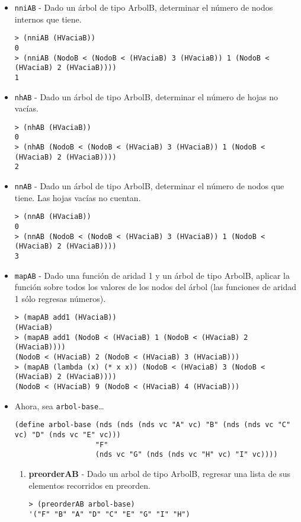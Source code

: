 \documentclass{article}
\begin{document}
\newpage
\begin{itemize}
\item \texttt{nniAB} - Dado un árbol de tipo ArbolB, determinar el número de nodos internos que tiene.
\begin{verbatim}
> (nniAB (HVaciaB))
0
> (nniAB (NodoB < (NodoB < (HVaciaB) 3 (HVaciaB)) 1 (NodoB < (HVaciaB) 2 (HVaciaB))))
1
\end{verbatim}

\item \texttt{nhAB} - Dado un árbol de tipo ArbolB, determinar el número de hojas no vacías.
\begin{verbatim}
> (nhAB (HVaciaB))
0
> (nhAB (NodoB < (NodoB < (HVaciaB) 3 (HVaciaB)) 1 (NodoB < (HVaciaB) 2 (HVaciaB))))
2
\end{verbatim}

\item \texttt{nnAB} - Dado un árbol de tipo ArbolB, determinar el número de nodos que tiene. Las hojas vacías no cuentan.
\begin{verbatim}
> (nnAB (HVaciaB))
0
> (nnAB (NodoB < (NodoB < (HVaciaB) 3 (HVaciaB)) 1 (NodoB < (HVaciaB) 2 (HVaciaB))))
3
\end{verbatim}

\item \texttt{mapAB} - Dado una función de aridad 1 y un árbol de tipo ArbolB, aplicar la función sobre todos los valores de los nodos del árbol (las funciones de aridad 1 sólo regresas números).
\begin{verbatim}
> (mapAB add1 (HVaciaB))
(HVaciaB)
> (mapAB add1 (NodoB < (HVaciaB) 1 (NodoB < (HVaciaB) 2 (HVaciaB))))
(NodoB < (HVaciaB) 2 (NodoB < (HVaciaB) 3 (HVaciaB)))
> (mapAB (lambda (x) (* x x)) (NodoB < (HVaciaB) 3 (NodoB < (HVaciaB) 2 (HVaciaB))))
(NodoB < (HVaciaB) 9 (NodoB < (HVaciaB) 4 (HVaciaB)))
\end{verbatim}

\newpage
\item Ahora, sea \verb;arbol-base;\dots
\begin{verbatim}
(define arbol-base (nds (nds (nds vc "A" vc) "B" (nds (nds vc "C" vc) "D" (nds vc "E" vc)))
                   "F"
                   (nds vc "G" (nds (nds vc "H" vc) "I" vc))))
\end{verbatim}
\begin{enumerate}
\item  \textbf{preorderAB} - Dado un arbol de tipo ArbolB, regresar una lista de sus elementos recorridos en preorden.
\begin{verbatim}
> (preorderAB arbol-base)
'("F" "B" "A" "D" "C" "E" "G" "I" "H")
\end{verbatim}


\end{enumerate}
\end{itemize}
\end{document}
